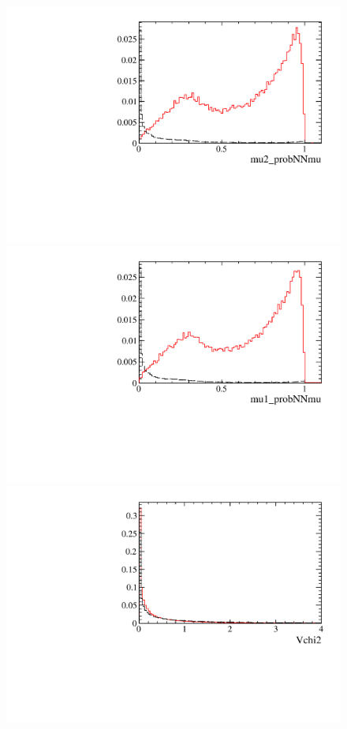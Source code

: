 \begin{figure} [htb!]
\begin{center}
\includegraphics[scale=0.20]{figs/mu2_probNNmuPARTIAL2pipi.pdf}
\includegraphics[scale=0.20]{figs/mu1_probNNmuPARTIAL2pipi.pdf}
\includegraphics[scale=0.20]{figs/Vchi2PARTIAL2pipi.pdf}

\end{center}
\end{figure}
